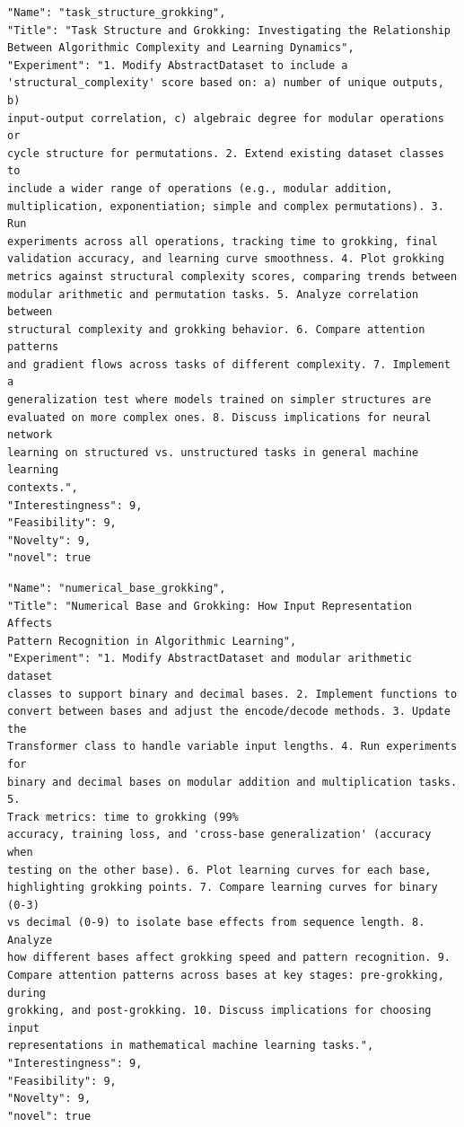 \documentclass[11pt, a4paper]{include/gdm_format}
\begin{document}
\begin{tcolorbox}[breakable,colback=blue!5!white, colframe=blue!75!black, title=Idea 40/50 - \texttt{task\_structure\_grokking}]
\small
\begin{verbatim}
"Name": "task_structure_grokking",
"Title": "Task Structure and Grokking: Investigating the Relationship
Between Algorithmic Complexity and Learning Dynamics",
"Experiment": "1. Modify AbstractDataset to include a
'structural_complexity' score based on: a) number of unique outputs, b)
input-output correlation, c) algebraic degree for modular operations or
cycle structure for permutations. 2. Extend existing dataset classes to
include a wider range of operations (e.g., modular addition,
multiplication, exponentiation; simple and complex permutations). 3. Run
experiments across all operations, tracking time to grokking, final
validation accuracy, and learning curve smoothness. 4. Plot grokking
metrics against structural complexity scores, comparing trends between
modular arithmetic and permutation tasks. 5. Analyze correlation between
structural complexity and grokking behavior. 6. Compare attention patterns
and gradient flows across tasks of different complexity. 7. Implement a
generalization test where models trained on simpler structures are
evaluated on more complex ones. 8. Discuss implications for neural network
learning on structured vs. unstructured tasks in general machine learning
contexts.",
"Interestingness": 9,
"Feasibility": 9,
"Novelty": 9,
"novel": true
\end{verbatim}
\end{tcolorbox}

\begin{tcolorbox}[breakable,colback=blue!5!white, colframe=blue!75!black, title=Idea 41/50 - \texttt{numerical\_base\_grokking}]
\small
\begin{verbatim}
"Name": "numerical_base_grokking",
"Title": "Numerical Base and Grokking: How Input Representation Affects
Pattern Recognition in Algorithmic Learning",
"Experiment": "1. Modify AbstractDataset and modular arithmetic dataset
classes to support binary and decimal bases. 2. Implement functions to
convert between bases and adjust the encode/decode methods. 3. Update the
Transformer class to handle variable input lengths. 4. Run experiments for
binary and decimal bases on modular addition and multiplication tasks. 5.
Track metrics: time to grokking (99%
accuracy, training loss, and 'cross-base generalization' (accuracy when
testing on the other base). 6. Plot learning curves for each base,
highlighting grokking points. 7. Compare learning curves for binary (0-3)
vs decimal (0-9) to isolate base effects from sequence length. 8. Analyze
how different bases affect grokking speed and pattern recognition. 9.
Compare attention patterns across bases at key stages: pre-grokking, during
grokking, and post-grokking. 10. Discuss implications for choosing input
representations in mathematical machine learning tasks.",
"Interestingness": 9,
"Feasibility": 9,
"Novelty": 9,
"novel": true
\end{verbatim}
\end{tcolorbox}
\end{document}
